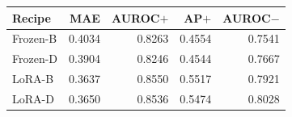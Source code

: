
{\small\setlength{\tabcolsep}{4pt}
\begin{tabularx}{\textwidth}{Xrrrr}
\toprule
Recipe & MAE & AUROC$+$ & AP$+$ & AUROC$-$ \\
\midrule
Frozen-B & 0.4034 & 0.8263 & 0.4554 & 0.7541 \\
Frozen-D & 0.3904 & 0.8246 & 0.4544 & 0.7667 \\
LoRA-B & 0.3637 & 0.8550 & 0.5517 & 0.7921 \\
LoRA-D & 0.3650 & 0.8536 & 0.5474 & 0.8028 \\
\bottomrule
\end{tabularx}}
